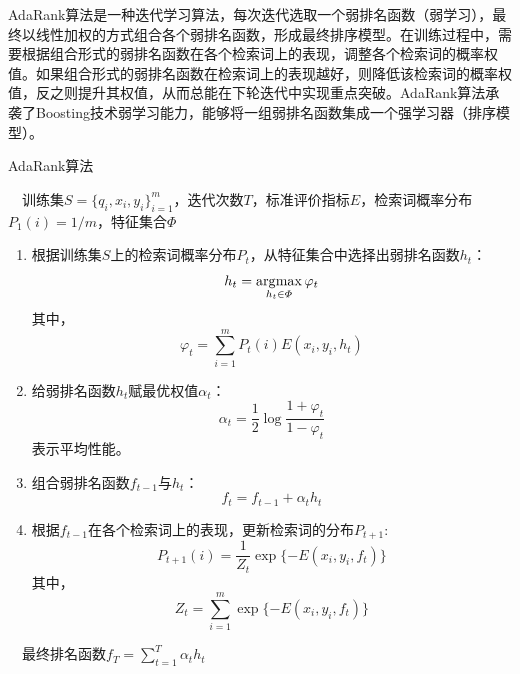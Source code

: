 AdaRank算法是一种迭代学习算法，每次迭代选取一个弱排名函数（弱学习），最终以线性加权的方式组合各个弱排名函数，形成最终排序模型。在训练过程中，需要根据组合形式的弱排名函数在各个检索词上的表现，调整各个检索词的概率权值。如果组合形式的弱排名函数在检索词上的表现越好，则降低该检索词的概率权值，反之则提升其权值，从而总能在下轮迭代中实现重点突破。AdaRank算法承袭了Boosting技术弱学习能力，能够将一组弱排名函数集成一个强学习器（排序模型）。

\begin{algorithm}[htbp]
        \caption{AdaRank算法}
        \begin{algorithmic}
            \REQUIRE ~~训练集$S=\{q_i,x_i,y_i\}^m_{i=1}$，迭代次数$T$，标准评价指标$E$，检索词概率分布$P_1(i)=1/m$，特征集合$\varPhi$\\
            \STATE
            \begin{enumerate}
                \item 根据训练集$S$上的检索词概率分布$P_t$，从特征集合中选择出弱排名函数$h_t$：
                \begin{equation}\label{eq:weaklearn}
                    h_t = \operatorname*{\mathrm{\arg\!\max}}\limits_{h_t \in \varPhi} \varphi_t
                \end{equation}
                其中，
                \[
                    \varphi_t = \sum\limits_{i=1}^m P_t(i) E(x_i,y_i,h_t)
                \]
                \item 给弱排名函数$h_t$赋最优权值$\alpha_t$：
                \begin{equation}\label{eq:weakweighting}
                    \alpha_t = \frac{1}{2} \log\frac{1 + \varphi_t}{1 - \varphi_t}
                \end{equation}
                表示平均性能。
                \item 组合弱排名函数$f_{t-1}$与$h_t$：
                 \begin{equation}\label{eq:fsam}
                    f_t = f_{t-1} + \alpha_t h_t
                \end{equation}
                \item 根据$f_{t-1}$在各个检索词上的表现，更新检索词的分布$P_{t+1}$:
                \begin{equation}\label{eq:distributeupdate}
                    P_{t+1}(i)=\frac{1}{Z_t}\exp\{-E(x_i, y_i, f_t)\}
                \end{equation}
                其中，
                \[
                    Z_t = \sum\limits_{i=1}^{m}\exp\{-E(x_i, y_i, f_t)\}
                \]

            \end{enumerate}
            \ENDFOR
            \ENSURE ~~最终排名函数$f_T = \sum\limits_{t=1}^{T}{\alpha_t h_t}$
        \end{algorithmic}
\end{algorithm}


